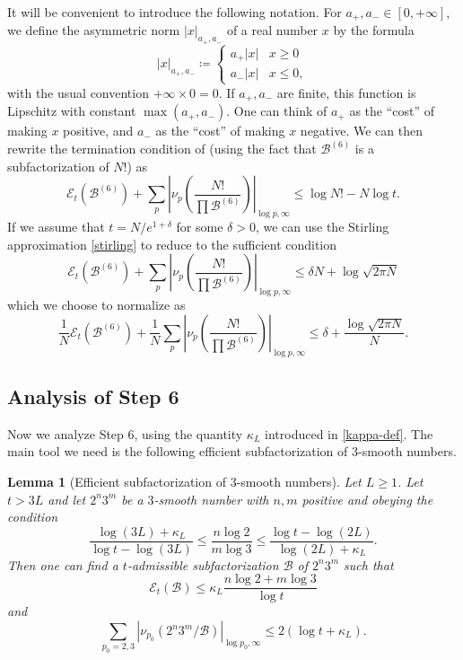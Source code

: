 \documentclass[12pt,a4paper,reqno]{amsart}
\numberwithin{equation}{section}
\theoremstyle{plain}
\newtheorem{lemma}[theorem]{Lemma}
\theoremstyle{definition}
\newcommand\tuple{{\mathcal B}}
\newcommand\excess{{\mathcal{E}}}
\begin{document}
It will be convenient to introduce the following notation.
For $a_+,a_- \in [0,+\infty]$, we define the asymmetric norm $|x|_{a_+,a_-}$ of a real number $x$ by the formula
$$ 
|x|_{a_+,a_-} \coloneqq  \begin{cases} 
  a_+ |x| & x\geq 0 \\
  a_- |x| & x\leq 0,
\end{cases}
$$
with the usual convention $+\infty \times 0 = 0$.
If $a_+,a_-$ are finite, this function is Lipschitz with constant $\max(a_+,a_-)$.  One can think of $a_+$ as the ``cost'' of making $x$ positive, and $a_-$ as the
``cost'' of making $x$ negative. We can then rewrite the termination condition of  (using the fact that $\tuple^{(6)}$ is a subfactorization of $N!$) as
$$
\excess_t(\tuple^{(6)}) + \sum_p \left| \nu_p\left(\frac{N!}{\prod \tuple^{(6)}}\right) \right|_{\log p,\infty}
\leq \log N! - N \log t.$$
If we assume that $t = N/e^{1+\delta}$ for some $\delta > 0$, we can use the Stirling approximation \eqref{stirling} to reduce to the sufficient condition
$$
\excess_t(\tuple^{(6)}) + \sum_p \left| \nu_p\left(\frac{N!}{\prod \tuple^{(6)}}\right) \right|_{\log p,\infty}
\leq \delta N + \log \sqrt{2\pi N}
$$
which we choose to normalize as
\begin{equation}\label{step7-cond}
\frac{1}{N}  \excess_t(\tuple^{(6)}) + \frac{1}{N} \sum_p \left| \nu_p\left(\frac{N!}{\prod \tuple^{(6)}}\right) \right|_{\log p,\infty}
  \leq \delta + \frac{\log \sqrt{2\pi N}}{N}.
\end{equation}


\subsection{Analysis of Step 6}

Now we analyze Step 6, using the quantity $\kappa_L$ introduced in \eqref{kappa-def}.  The main tool we need is the following efficient subfactorization of $3$-smooth numbers.


\begin{lemma}[Efficient subfactorization of $3$-smooth numbers]\label{bound23}  Let $L \geq 1$.  Let $t > 3L$ and let $2^n 3^m$ be a $3$-smooth number with $n,m$ positive and obeying the condition
  \begin{equation}\label{B-bound}
    \frac{\log(3L)+\kappa_L}{\log t - \log(3L)} \leq \frac{n \log 2}{m \log 3} \leq \frac{\log t - \log(2L)}{\log(2L)+\kappa_L}.
  \end{equation}
    Then one can find a $t$-admissible subfactorization $\tuple$ of $2^n 3^m$ such that
  \begin{equation}\label{excess-bound} 
    \excess_t(\tuple) \leq \kappa_L \frac{n \log 2 + m \log 3}{\log t} 
  \end{equation}
  and
  \begin{equation}\label{surplus-bound} 
    \sum_{p_0=2,3} |\nu_{p_0}(2^n 3^m/\tuple)|_{\log p_0,\infty} \leq 2(\log t + \kappa_L).
  \end{equation}
  \end{lemma}
  
\end{document}
